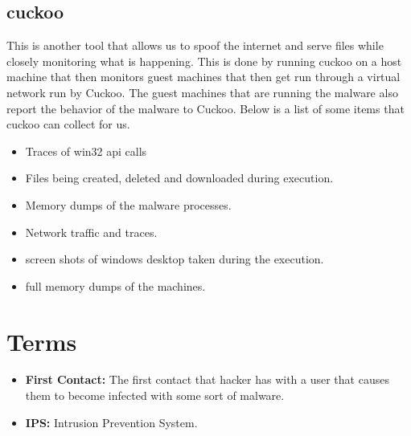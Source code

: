 \documentclass[letterpaper, onecolumn,10pt]{IEEEtran}
\begin{document}
            \subsection{cuckoo}
            This is another tool that allows us to spoof the internet and serve files while closely monitoring what is happening. This is done by running cuckoo on a host machine that then monitors guest machines that then get run through a virtual network run by Cuckoo. The guest machines that are running the malware also report the behavior of the malware to Cuckoo. Below is a list of some items that cuckoo can collect for us.\\
            \begin{itemize}
                \item Traces of win32 api calls\\
                \item Files being created, deleted and downloaded during execution.\\
                \item Memory dumps of the malware processes.\\
                \item Network traffic and traces.\\
                \item screen shots of windows desktop taken during the execution.\\
                \item full memory dumps of the machines.\\
            \end{itemize}
        
        \section{Terms}
            \begin{itemize}
                \item \textbf{First Contact:} The first contact that hacker has with a user that causes them to become infected with some sort of malware.\\
                \item \textbf{IPS:} Intrusion Prevention System.\\
            \end{itemize}

		
\end{document}
